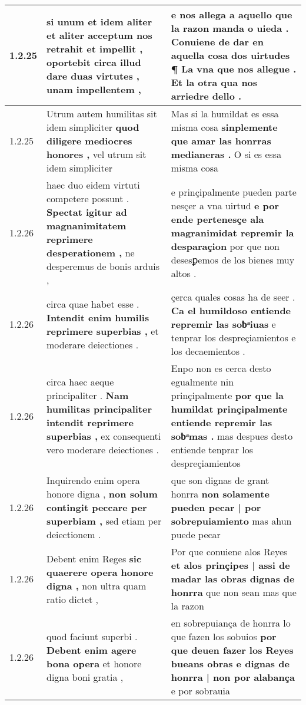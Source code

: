 \begin{tabular}{|p{1cm}|p{6.5cm}|p{6.5cm}|}
1.2.25 & si unum et idem aliter et aliter acceptum nos retrahit et impellit , \textbf{ oportebit circa illud dare duas virtutes , } unam impellentem , & e nos allega a aquello que la razon manda o uieda . \textbf{ Conuiene de dar en aquella cosa dos uirtudes ¶ La vna que nos allegue . } Et la otra qua nos arriedre dello . \\\hline
1.2.25 & Utrum autem humilitas sit idem simpliciter \textbf{ quod diligere mediocres honores , } vel utrum sit idem simpliciter & Mas si la humildat es essa misma cosa \textbf{ sinplemente que amar las honrras medianeras . } O si es essa misma cosa \\\hline
1.2.26 & haec duo eidem virtuti competere possunt . \textbf{ Spectat igitur ad magnanimitatem reprimere desperationem , } ne desperemus de bonis arduis , & e prinçipalmente pueden parte nesçer a vna uirtud \textbf{ e por ende pertenesçe ala magranimidat repremir la desparaçion } por que non desesꝑemos de los bienes muy altos . \\\hline
1.2.26 & circa quae habet esse . \textbf{ Intendit enim humilis reprimere superbias , } et moderare deiectiones . & çerca quales cosas ha de seer . \textbf{ Ca el humildoso entiende repremir las soƀͣiuas } e tenprar los despreçiamientos e los decaemientos . \\\hline
1.2.26 & circa haec aeque principaliter . \textbf{ Nam humilitas principaliter intendit reprimere superbias , } ex consequenti vero moderare deiectiones . & Enpo non es cerca desto egualmente nin prinçipalmente \textbf{ por que la humildat prinçipalmente entiende repremir las soƀͣmas . } mas despues desto entiende tenprar los despreçiamientos \\\hline
1.2.26 & Inquirendo enim opera honore digna , \textbf{ non solum contingit peccare per superbiam , } sed etiam per deiectionem . & que son dignas de grant honrra \textbf{ non solamente pueden pecar | por sobrepuiamiento } mas ahun puede pecar \\\hline
1.2.26 & Debent enim Reges \textbf{ sic quaerere opera honore digna , } non ultra quam ratio dictet , & Por que conuiene alos Reyes \textbf{ et alos prinçipes | assi de madar las obras dignas de honrra } que non sean mas que la razon \\\hline
1.2.26 & quod faciunt superbi . \textbf{ Debent enim agere bona opera } et honore digna boni gratia , & en sobrepuiança de honrra lo que fazen los sobuios \textbf{ por que deuen fazer los Reyes bueans obras e dignas de honrra | non por alabança } e por sobrauia \\\hline

\end{tabular}
